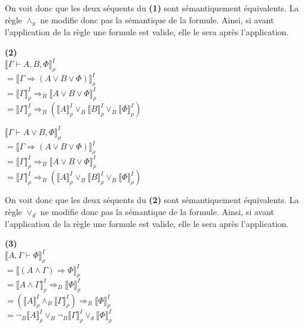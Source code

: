 \documentclass[11pt,letterpaper]{article}
\begin{document}
\vspace{10 px}

On voit donc que les deux séquents du \textbf{(1)} sont sémantiquement équivalents. La règle $\land_{g}$ ne modifie donc pas la sémantique de la formule. Ainsi, si avant l'application de la règle une formule est valide, elle le sera après l'application.

\vspace{10px}

\textbf{(2)}\\
$\llbracket \Gamma\vdash A,B,\Phi \rrbracket^{I}_ {\rho}$\\
$= \llbracket \Gamma \Rightarrow (A \lor B \lor \Phi)\rrbracket^{I}_ {\rho}$\\
$= \llbracket \Gamma\rrbracket^{I}_ {\rho} \Rightarrow_{B} \llbracket A \lor B \lor \Phi\rrbracket^{I}_ {\rho}$\\
$= \llbracket \Gamma \rrbracket^{I}_ {\rho} \Rightarrow_{B} (\llbracket A \rrbracket^{I}_ {\rho} \lor_{B} \llbracket B \rrbracket^{I}_ {\rho} \lor_{B} \llbracket \Phi\rrbracket^{I}_ {\rho})$\\

\vspace{10 px}

$\llbracket \Gamma\vdash A \lor B,\Phi\rrbracket^{I}_ {\rho}$\\
$= \llbracket \Gamma \Rightarrow (A \lor B \lor \Phi)\rrbracket^{I}_ {\rho}$\\
$= \llbracket \Gamma\rrbracket^{I}_ {\rho} \Rightarrow_{B} \llbracket A \lor B \lor \Phi\rrbracket^{I}_ {\rho}$\\
$= \llbracket \Gamma \rrbracket^{I}_ {\rho} \Rightarrow_{B} (\llbracket A \rrbracket^{I}_ {\rho} \lor_{B} \llbracket B \rrbracket^{I}_ {\rho} \lor_{B} \llbracket \Phi \rrbracket^{I}_ {\rho})$\\

\vspace{10px}

On voit donc que les deux séquents du \textbf{(2)} sont sémantiquement équivalents. La règle $\lor_{d}$ ne modifie donc pas la sémantique de la formule. Ainsi, si avant l'application de la règle une formule est valide, elle le sera après l'application.\\

\vspace{10px}

{\bfseries (3)}\\
$\llbracket A,\Gamma\vdash \Phi \rrbracket^{I}_ {\rho}$\\
$= \llbracket (A \land \Gamma) \Rightarrow \Phi\rrbracket^{I}_ {\rho}$\\
$= \llbracket A \land \Gamma \rrbracket^{I}_ {\rho} \Rightarrow_{B} \llbracket \Phi\rrbracket^{I}_ {\rho}$\\
$= (\llbracket A \rrbracket^{I}_ {\rho} \land_{B} \llbracket \Gamma \rrbracket^{I}_ {\rho} )\Rightarrow_{B} \llbracket \Phi \rrbracket^{I}_ {\rho}$\\
$= \neg_{B} \llbracket A \rrbracket^{I}_ {\rho} \lor_{B} \neg_{B} \llbracket \Gamma \rrbracket^{I}_ {\rho} \lor_{d} \llbracket\Phi \rrbracket^{I}_ {\rho}$\\
\vspace{10px}
\end{document}
